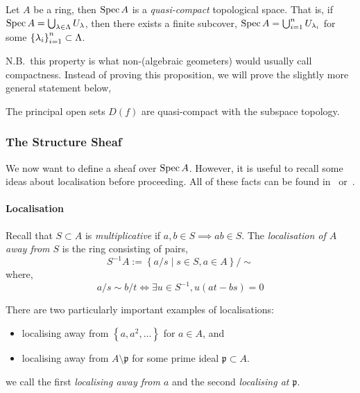 \documentclass[000-main.tex]{subfiles}
\begin{document}
\begin{proposition}
  Let $A$ be a ring, then $\operatorname{Spec} A$ is a \emph{quasi-compact} topological space.
  That is, if $\operatorname{Spec} A = \bigcup_{\lambda\in \Lambda}U_\lambda$, then there exists a finite subcover, $\operatorname{Spec} A = \bigcup_{i = 1}^n U_{\lambda_i}$ for some ${\qty{\lambda_i}}^n_{i = 1}\subset \Lambda$.
\end{proposition}
N.B.\ this property is what non-(algebraic geometers) would usually call compactness.
Instead of proving this proposition, we will prove the slightly more general statement below,
\begin{proposition}
  The principal open sets $D(f)$ are quasi-compact with the subspace topology.
\end{proposition}

\subsubsection{The Structure Sheaf}%
\label{sec:structure-sheaf}

We now want to define a sheaf over $\operatorname{Spec} A$.
However, it is useful to recall some ideas about localisation before proceeding.
All of these facts can be found in~\cite[][81-86]{altmanTermCommutativeAlgebra2013} or~\cite[][36-49]{atiyahIntroductionCommutativeAlgebra2000}.

\paragraph{Localisation}

Recall that $S\subset A$ is \emph{multiplicative} if $a, b\in S \implies ab\in S$.
The \emph{localisation of $A$ away from $S$} is the ring consisting of pairs,
\begin{displaymath}
  S^{-1}A := \left\{ a/s \mid s\in S, a\in A \right\}/\sim
\end{displaymath}
where,
\begin{displaymath}
  a/s \sim b/t \iff
  \exists u\in S^{-1}, u(at - bs) = 0
\end{displaymath}

There are two particularly important examples of localisations:
\begin{itemize}
  \item localising away from $\left\{a, a^2, \ldots \right\}$ for $a\in A$, and
  \item localising away from $A\setminus\mathfrak{p}$ for some prime ideal $\mathfrak{p}\subset A$.
\end{itemize}
we call the first \emph{localising away from $a$} and the second \emph{localising at $\mathfrak{p}$}.
\end{document}
